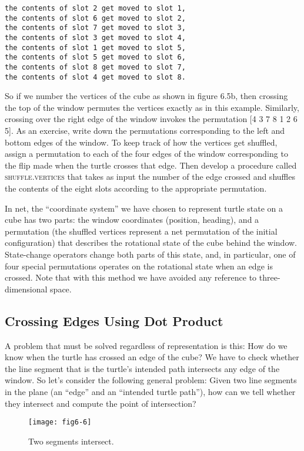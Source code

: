 \documentclass{book}
\begin{document}
\begin{verbatim}
the contents of slot 2 get moved to slot 1,
the contents of slot 6 get moved to slot 2,
the contents of slot 7 get moved to slot 3,
the contents of slot 3 get moved to slot 4,
the contents of slot 1 get moved to slot 5,
the contents of slot 5 get moved to slot 6,
the contents of slot 8 get moved to slot 7,
the contents of slot 4 get moved to slot 8.
\end{verbatim}
So if we number the vertices of the cube as shown in figure 6.5b, then
crossing the top of the window permutes the vertices exactly as in this
example. Similarly, crossing over the right edge of the window invokes
the permutation [4 3 7 8 1 2 6 5]. As an exercise, write down the
permutations corresponding to the left and bottom edges of the window.
To keep track of how the vertices get shuffled, assign a permutation
to each of the four edges of the window corresponding to the flip made
when the turtle crosses that edge. Then develop a procedure called
\textsc{shuffle}\textsc{.vertices} that takes as input the number of the edge crossed
and shuffles the contents of the eight slots according to the appropriate
permutation.

In net, the ``coordinate system'' we have chosen to represent turtle
state on a cube has two parts: the window coordinates (position, heading), and a permutation (the shuffled vertices represent a net permutation of the initial configuration) that describes the rotational state of the
cube behind the window. State-change operators change both parts of
this state, and, in particular, one of four special permutations operates
on the rotational state when an edge is crossed. Note that with this
method we have avoided any reference to three-dimensional space.

\subsection{Crossing Edges Using Dot Product}

A problem that must be solved regardless of representation is this: How
do we know when the turtle has crossed an edge of the cube? We
have to check whether the line segment that is the turtle's intended
path intersects any edge of the window. So let's consider the following
general problem: Given two line segments in the plane (an ``edge'' and
an ``intended turtle path''), how can we tell whether they intersect and
compute the point of intersection?

\begin{figure}
\begin{center}
\texttt{[image: fig6-6]}
\caption{Two segments intersect.}
\end{center}
\end{figure}
\end{document}
